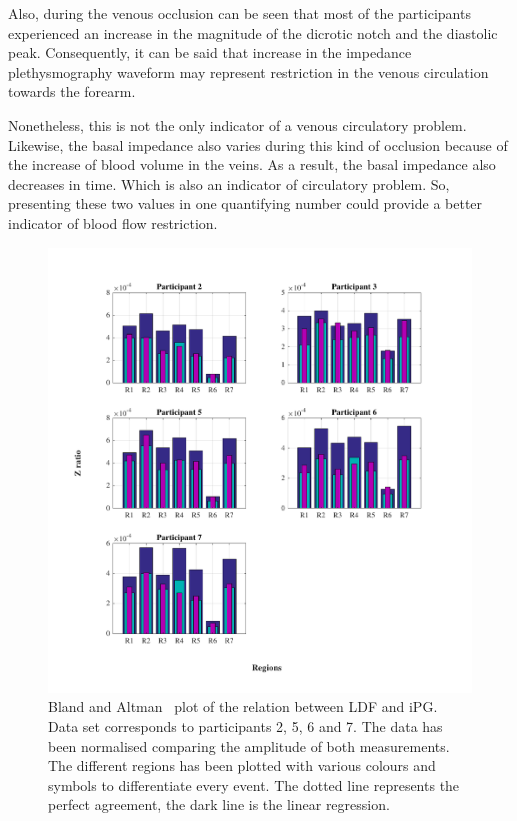 Also, during the venous occlusion can be seen that most of the participants experienced an increase in the magnitude of the dicrotic notch and the diastolic peak. Consequently, it can be said that increase in the impedance plethysmography waveform may represent restriction in the venous circulation towards the forearm. 

Nonetheless, this is not the only indicator of a venous circulatory problem. Likewise, the basal impedance also varies during this kind of occlusion because of the increase of blood volume in the veins. As a result, the basal impedance also decreases in time. Which is also an indicator of circulatory problem. So, presenting these two values in one quantifying number could provide a better indicator of blood flow restriction. 

\begin{figure}[!htpb]
	\includegraphics[width=1\textwidth,keepaspectratio]{figure2}    
	\caption[Bland and Altman plot of the relation between LDF and iPG]{Bland and Altman~\cite{bland1986statistical} plot of the relation between LDF and iPG. Data set corresponds to participants 2, 5, 6 and 7. The data has been normalised comparing the amplitude of both measurements. The different regions has been plotted with various colours and symbols to differentiate every event. The dotted line represents the perfect agreement, the dark line is the linear regression.}
	\label{fig:ration Z bar}
\end{figure}

